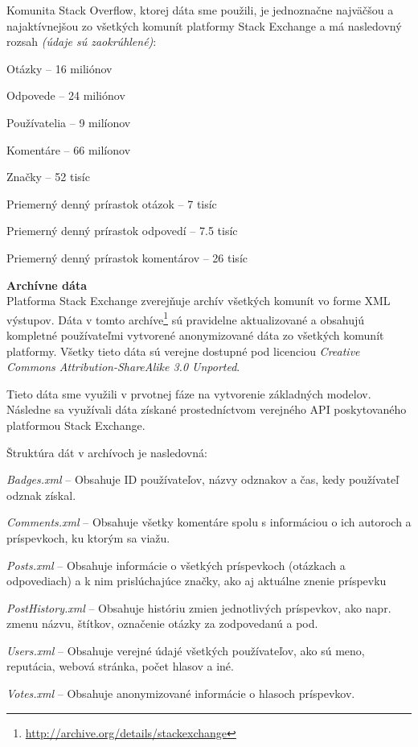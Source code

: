 Komunita Stack Overflow, ktorej dáta sme použili, je jednoznačne najväčšou a najaktívnejšou zo všetkých komunít
platformy Stack Exchange a má nasledovný rozsah \emph{(údaje sú zaokrúhlené)}:

\begin{my_itemize}
    \item{Otázky -- 16 miliónov}
    \item{Odpovede -- 24 miliónov}
    \item{Používatelia -- 9 milíonov}
    \item{Komentáre -- 66 milíonov}
    \item{Značky -- 52 tisíc}
    \item{Priemerný denný prírastok otázok -- 7 tisíc}
    \item{Priemerný denný prírastok odpovedí -- 7.5 tisíc}
    \item{Priemerný denný prírastok komentárov -- 26 tisíc}
\end{my_itemize}

\textbf{Archívne dáta}\\
Platforma Stack Exchange zverejňuje archív všetkých komunít vo forme XML výstupov. Dáta v tomto
archíve\footnote{\url{http://archive.org/details/stackexchange}} sú pravidelne aktualizované a obsahujú kompletné
používateľmi vytvorené anonymizované dáta zo všetkých komunít platformy. Všetky tieto dáta sú verejne dostupné pod
licenciou \emph{Creative Commons Attribution-ShareAlike 3.0 Unported}.

Tieto dáta sme využili v prvotnej fáze na vytvorenie základných modelov. Následne sa využívali dáta získané
prostedníctvom verejného API poskytovaného platformou Stack Exchange.

Štruktúra dát v archívoch je nasledovná:

\begin{my_itemize}
  \item{\textit{Badges.xml} -- Obsahuje ID používateľov, názvy odznakov a čas, kedy používateľ odznak získal.}
  \item{\textit{Comments.xml} -- Obsahuje všetky komentáre spolu s informáciou o ich autoroch a príspevkoch, ku ktorým sa viažu.}
  \item{\textit{Posts.xml} -- Obsahuje informácie o všetkých príspevkoch (otázkach a odpovediach) a k nim prislúchajúce značky, ako aj aktuálne znenie príspevku}
  \item{\textit{PostHistory.xml} -- Obsahuje históriu zmien jednotlivých príspevkov, ako napr. zmenu názvu, štítkov, označenie otázky za zodpovedanú a pod.}
  \item{\textit{Users.xml} -- Obsahuje verejné údajé všetkých používateľov, ako sú meno, reputácia, webová stránka, počet hlasov a iné.}
  \item{\textit{Votes.xml} -- Obsahuje anonymizované informácie o hlasoch príspevkov.}
\end{my_itemize}

